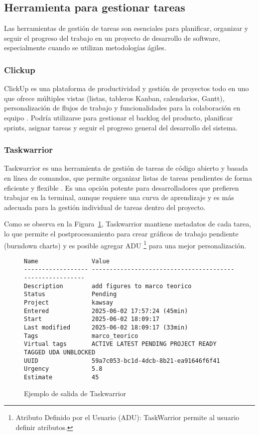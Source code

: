 \subsection{Herramienta para gestionar tareas}
Las herramientas de gestión de tareas son esenciales para planificar, organizar y seguir el progreso del trabajo en un proyecto de desarrollo de software, especialmente cuando se utilizan metodologías ágiles.

\subsubsection{Clickup}
ClickUp es una plataforma de productividad y gestión de proyectos todo en uno que ofrece múltiples vistas (listas, tableros Kanban, calendarios, Gantt), personalización de flujos de trabajo y funcionalidades para la colaboración en equipo \parencite{ClickUp}.
Podría utilizarse para gestionar el backlog del producto, planificar sprints, asignar tareas y seguir el progreso general del desarrollo del sistema.

\subsubsection{Taskwarrior}
Taskwarrior es una herramienta de gestión de tareas de código abierto y basada en línea de comandos, que permite organizar listas de tareas pendientes de forma eficiente y flexible \parencite{Taskwarrior}.
Es una opción potente para desarrolladores que prefieren trabajar en la terminal, aunque requiere una curva de aprendizaje y es más adecuada para la gestión individual de tareas dentro del proyecto.

Como se observa en la Figura~\ref{fig:taskWarriorTaskOutput}, Taskwarrior mantiene metadatos de cada tarea, lo que permite el postprocesamiento para crear gráficos de trabajo pendiente (burndown charts) y es posible agregar ADU \footnote{Atributo Definido por el Usuario (ADU): TaskWarrior permite al usuario definir atributos.} para una mejor personalización.

\begin{figure}
	\caption{Ejemplo de salida de Taskwarrior}\label{fig:taskWarriorTaskOutput}
	\begin{verbatim}
Name               Value
------------------ ---------------------------------------------------------
Description        add figures to marco teorico
Status             Pending
Project            kawsay
Entered            2025-06-02 17:57:24 (45min)
Start              2025-06-02 18:09:17
Last modified      2025-06-02 18:09:17 (33min)
Tags               marco_teorico
Virtual tags       ACTIVE LATEST PENDING PROJECT READY TAGGED UDA UNBLOCKED
UUID               59a7c053-bc1d-4dcb-8b21-ea91646f6f41
Urgency            5.8
Estimate           45
	\end{verbatim}
\end{figure}

